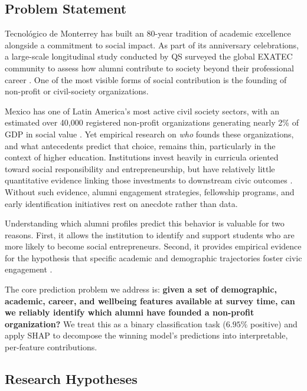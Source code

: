 \documentclass[10pt,twocolumn]{article}
\begin{document}
\subsection{Problem Statement}

Tecnológico de Monterrey has built an 80-year tradition of academic excellence
alongside a commitment to social impact. As part of its anniversary
celebrations, a large-scale longitudinal study conducted by QS surveyed the
global EXATEC community to assess how alumni contribute to society beyond their
professional career \cite{qs2023}. One of the most visible forms of social
contribution is the founding of non-profit or civil-society organizations.

Mexico has one of Latin America's most active civil society sectors, with an
estimated over 40{,}000 registered non-profit organizations generating nearly
2\% of GDP in social value \cite{cemefi2020}. Yet empirical research on
\emph{who} founds these organizations, and what antecedents predict that
choice, remains thin, particularly in the context of higher education.
Institutions invest heavily in curricula oriented toward social responsibility
and entrepreneurship, but have relatively little quantitative evidence linking
those investments to downstream civic outcomes \cite{alnaemi2026}. Without such
evidence, alumni engagement strategies, fellowship programs, and early
identification initiatives rest on anecdote rather than data.

Understanding which alumni profiles predict this behavior is valuable for two
reasons. First, it allows the institution to identify and support students who
are more likely to become social entrepreneurs. Second, it provides empirical
evidence for the hypothesis that specific academic and demographic trajectories
foster civic engagement \cite{modem2021}.

The core prediction problem we address is: \textbf{given a set of demographic,
academic, career, and wellbeing features available at survey time, can we
reliably identify which alumni have founded a non-profit organization?} We
treat this as a binary classification task ($6.95\%$ positive) and apply SHAP
\cite{lundberg2017} to decompose the winning model's predictions into
interpretable, per-feature contributions.

\subsection{Research Hypotheses}
\end{document}
